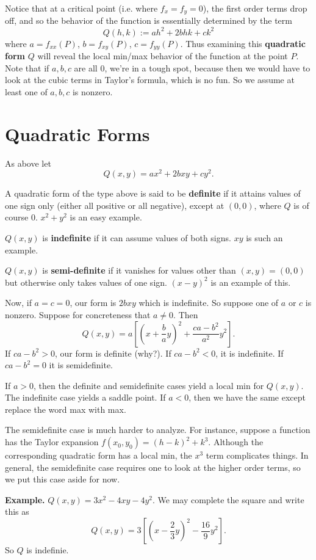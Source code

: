 \documentclass{article}
\begin{document}
Notice that at a critical point (i.e. where $f_x=f_y=0$), the 
first order terms drop off, and so the behavior of the function 
is essentially determined by the term
\[Q(h,k) := ah^2 + 2bhk + ck^2\]
where $a = f_{xx}(P)$, $b=f_{xy}(P)$, $c=f_{yy}(P)$.
Thus examining this \textbf{quadratic form} $Q$ will reveal the local min/max
behavior of the function at the point $P$. Note that if $a,b,c$ are
all $0$, we're in a tough spot, because then we would have to look at the
cubic terms in Taylor's formula, which is no fun. So we assume at 
least one of $a,b,c$ is nonzero.




\section*{Quadratic Forms}

As above let 
\[Q(x,y) = ax^2 + 2bxy + cy^2.\]

A quadratic form of the type above is said to be \textbf{definite} if 
it attains values of one sign only (either all positive or all negative), 
except at $(0,0)$, where $Q$ is of course $0$. $x^2 + y^2$ is an easy example.

$Q(x,y)$ is \textbf{indefinite} if it can assume values of both signs. 
$xy$ is such an example.

$Q(x,y)$ is \textbf{semi-definite} if it vanishes for values other 
than $(x,y)=(0,0)$ but otherwise only takes values of one sign. 
$(x-y)^2$ is an example of this.

Now, if $a=c=0$, our form is $2bxy$ which is indefinite. 
So suppose one of $a$ or $c$ is nonzero. Suppose for concreteness
that $a \neq 0$. Then 
\[Q(x,y) = a \left[ {\left( x + \frac{b}{a}y \right)}^2 +\frac{ca-b^2}{a^2}y^2\right].\]
If $ca-b^2>0$, our form is definite (why?). If $ca-b^2 < 0$, it is indefinite.
If $ca-b^2=0$ it is semidefinite.

If $a>0$, then the definite and semidefinite cases yield a local min
for $Q(x,y)$. The indefinite case yields a saddle point. If $a<0$, then
we have the same except replace the word max with max.

The semidefinite case is much harder to analyze. For instance, suppose a function
has the Taylor expansion $f(x_0,y_0)= (h-k)^2 + k^3$. Although the corresponding
quadratic form has a local min, the $x^3$ term complicates things. In general,
the semidefinite case requires one to look at the higher order terms, so we put this case aside
for now.

\textbf{Example.} $Q(x,y) = 3x^2 - 4xy - 4y^2$. 
We may complete the square and write this as 
\[Q(x,y) = 3 \left[ \left( x - \frac{2}{3}y \right)^2 - \frac{16}{9}y^2 \right].\]
So $Q$ is indefinie.
\end{document}
